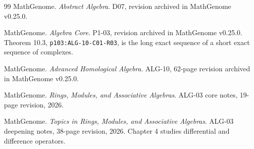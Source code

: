 \documentclass[11pt,oneside,openany]{book}
\theoremstyle{definition}
\theoremstyle{remark}
\begin{document}
\begin{thebibliography}{99}
MathGenome.
\emph{Abstract Algebra}.
D07, revision archived in MathGenome v0.25.0.

MathGenome.
\emph{Algebra Core}.
P1-03, revision archived in MathGenome v0.25.0.
Theorem 10.3, \texttt{p103:ALG-10-C01-R03}, is the long exact sequence
of a short exact sequence of complexes.

MathGenome.
\emph{Advanced Homological Algebra}.
ALG-10, 62-page revision archived in MathGenome v0.25.0.

MathGenome.
\emph{Rings, Modules, and Associative Algebras}.
ALG-03 core notes, 19-page revision, 2026.

MathGenome.
\emph{Topics in Rings, Modules, and Associative Algebras}.
ALG-03 deepening notes, 38-page revision, 2026.
Chapter 4 studies differential and difference operators.

\end{thebibliography}
\endgroup
\end{document}
